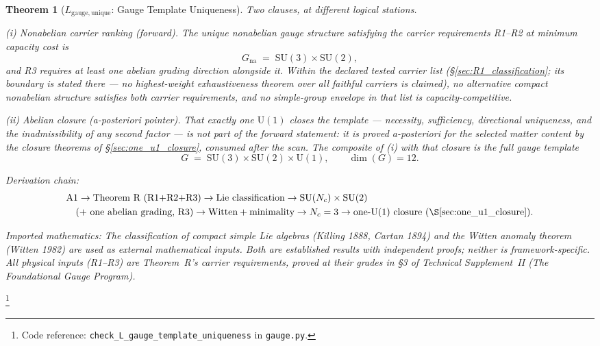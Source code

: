 \documentclass[11pt]{article}
\newtheorem{theorem}{Theorem}[section]
\theoremstyle{definition}
\newcommand{\SU}{\mathrm{SU}}
\newcommand{\U}{\mathrm{U}}
\newcommand{\coderef}[2]{\footnote{Code reference: \texttt{#1} in \texttt{#2}.}}
\newcommand{\TSII}{Technical Supplement~II (\emph{The Foundational Gauge Program})}
\begin{document}
\begin{theorem}[$L_{\mathrm{gauge,unique}}$: Gauge Template Uniqueness]\label{thm:gauge_unique}
Two clauses, at different logical stations.

\smallskip\noindent\textit{(i) Nonabelian carrier ranking (forward).}\quad
The unique nonabelian gauge structure satisfying the carrier
requirements R1--R2 at minimum capacity cost is
\[
  G_{\mathrm{na}} \;=\; \SU(3) \times \SU(2),
\]
and R3 requires at least one abelian grading direction alongside it.
Within the declared tested carrier list
(\S\ref{sec:R1_classification}; its boundary is stated there --- no
highest-weight exhaustiveness theorem over all faithful carriers is
claimed), no alternative compact nonabelian structure satisfies both
carrier requirements, and no simple-group envelope in that list is
capacity-competitive.

\smallskip\noindent\textit{(ii) Abelian closure (a-posteriori pointer).}\quad
That exactly one $\U(1)$ closes the template --- necessity,
sufficiency, directional uniqueness, and the inadmissibility of any
second factor --- is not part of the forward statement: it is proved
a-posteriori for the selected matter content by the closure theorems
of \S\ref{sec:one_u1_closure}, consumed after the scan.  The composite
of (i) with that closure is the full gauge template
\[
  G \;=\; \SU(3) \times \SU(2) \times \U(1),
  \qquad \dim(G) = 12.
\]

\smallskip\noindent\textit{Derivation chain:}
\begin{align*}
&\text{A1} \to \text{Theorem R (R1+R2+R3)} \to
\text{Lie classification} \to
\SU(N_c) \times \SU(2)\\
&\quad (+\text{ one abelian grading, R3})
\to \text{Witten} + \text{minimality} \to N_c = 3 \to
\text{one-U(1) closure (\S\ref{sec:one_u1_closure})}.
\end{align*}

\smallskip\noindent\textit{Imported mathematics:}\quad
The classification of compact simple Lie algebras (Killing 1888, Cartan 1894)
and the Witten anomaly theorem (Witten 1982) are used as external
mathematical inputs.  Both are established results with independent
proofs; neither is framework-specific.  All physical inputs (R1--R3)
are Theorem~R's carrier requirements, proved at their grades in
\S3 of \TSII{}.
\end{theorem}
\coderef{check\_L\_gauge\_template\_uniqueness}{gauge.py}




\newpage
\end{document}
